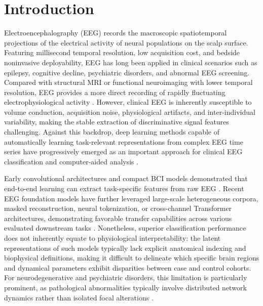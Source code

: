\documentclass{article}
\begin{document}

\section{Introduction}
Electroencephalography (EEG) records the macroscopic spatiotemporal projections of the electrical activity of neural populations on the scalp surface. Featuring millisecond temporal resolution, low acquisition cost, and bedside noninvasive deployability, EEG has long been applied in clinical scenarios such as epilepsy, cognitive decline, psychiatric disorders, and abnormal EEG screening. Compared with structural MRI or functional neuroimaging with lower temporal resolution, EEG provides a more direct recording of rapidly fluctuating electrophysiological activity \citep{nunez2006electric,buzsaki2012origin}. However, clinical EEG is inherently susceptible to volume conduction, acquisition noise, physiological artifacts, and inter-individual variability, making the stable extraction of discriminative signal features challenging. Against this backdrop, deep learning methods capable of automatically learning task-relevant representations from complex EEG time series have progressively emerged as an important approach for clinical EEG classification and computer-aided analysis \citep{schirrmeister2017deep,lawhern2018eegnet,roy2019deep}.

Early convolutional architectures and compact BCI models demonstrated that end-to-end learning can extract task-specific features from raw EEG \citep{schirrmeister2017deep,lawhern2018eegnet}. Recent EEG foundation models have further leveraged large-scale heterogeneous corpora, masked reconstruction, neural tokenization, or cross-channel Transformer architectures, demonstrating favorable transfer capabilities across various evaluated downstream tasks \citep{jiang2024labram,wang2025cbramod,yang2024brainomni}. Nonetheless, superior classification performance does not inherently equate to physiological interpretability: the latent representations of such models typically lack explicit anatomical indexing and biophysical definitions, making it difficult to delineate which specific brain regions and dynamical parameters exhibit disparities between case and control cohorts. For neurodegenerative and psychiatric disorders, this limitation is particularly prominent, as pathological abnormalities typically involve distributed network dynamics rather than isolated focal alterations \citep{bassett2017network,fornito2015connectomics}.
\end{document}

